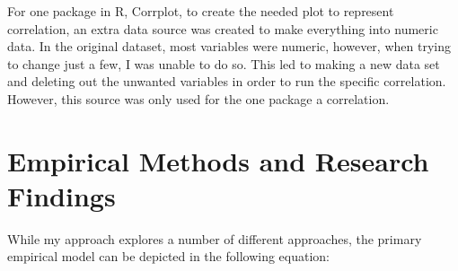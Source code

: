 \documentclass[12pt,english]{article}
\begin{document}
\begin{Data}
\begin{doublespace}
\indent For one package in R, Corrplot, to create the needed plot to represent correlation, an extra data source was created to make everything into numeric data. In the original dataset, most variables were numeric, however, when trying to change just a few, I was unable to do so. This led to making a new data set and deleting out the unwanted variables in order to run the specific correlation. However, this source was only used for the one package a correlation. 

\end{doublespace}
\end{Data}


\section{Empirical Methods and Research Findings}\label{sec:methods}
While my approach explores a number of different approaches, the primary empirical model can be depicted in the following equation:
\end{document}
